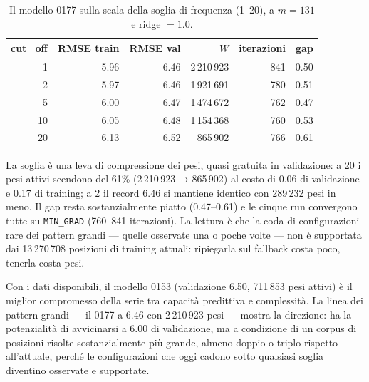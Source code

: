 \begin{table}[ht]
\centering
\small
\begin{tabular}{rrrrrr}
\toprule
cut\_off & RMSE train & RMSE val & $W$ & iterazioni & gap \\
\midrule
1 & 5.96 & 6.46 & 2\,210\,923 & 841 & 0.50 \\
2 & 5.97 & 6.46 & 1\,921\,691 & 780 & 0.51 \\
5 & 6.00 & 6.47 & 1\,474\,672 & 762 & 0.47 \\
10 & 6.05 & 6.48 & 1\,154\,368 & 760 & 0.53 \\
20 & 6.13 & 6.52 & 865\,902 & 766 & 0.61 \\
\bottomrule
\end{tabular}
\caption{Il modello 0177 sulla scala della soglia di frequenza
(1--20), a $m = 131$ e ridge $= 1.0$.}
\label{tab:soglia}
\end{table}

La soglia è una leva di compressione dei pesi, quasi gratuita in
validazione: a 20 i pesi attivi scendono del 61\%
(2\,210\,923 → 865\,902) al costo di 0.06 di validazione e 0.17
di training; a 2 il record 6.46 si mantiene identico con
289\,232 pesi in meno. Il gap resta sostanzialmente piatto
(0.47--0.61) e le cinque run convergono tutte su
\texttt{MIN\_GRAD} (760--841 iterazioni). La lettura è che la
coda di configurazioni rare dei pattern grandi — quelle
osservate una o poche volte — non è supportata dai
13\,270\,708 posizioni di training attuali: ripiegarla sul
fallback costa poco, tenerla costa pesi.

Con i dati disponibili, il modello 0153 (validazione 6.50,
711\,853 pesi attivi) è il miglior compromesso della serie tra
capacità predittiva e complessità. La linea dei pattern grandi
— il 0177 a 6.46 con 2\,210\,923 pesi — mostra la direzione: ha
la potenzialità di avvicinarsi a 6.00 di validazione, ma a
condizione di un corpus di posizioni risolte sostanzialmente
più grande, almeno doppio o triplo rispetto all'attuale, perché
le configurazioni che oggi cadono sotto qualsiasi soglia
diventino osservate e supportate.
